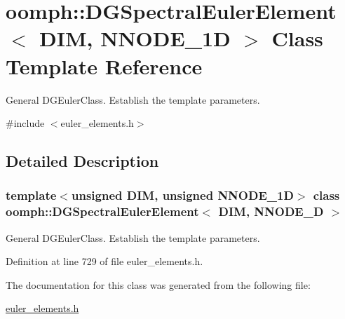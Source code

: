 \hypertarget{classoomph_1_1DGSpectralEulerElement}{}\section{oomph\+:\+:D\+G\+Spectral\+Euler\+Element$<$ D\+IM, N\+N\+O\+D\+E\+\_\+1D $>$ Class Template Reference}
\label{classoomph_1_1DGSpectralEulerElement}


General D\+G\+Euler\+Class. Establish the template parameters.  




{\ttfamily \#include $<$euler\+\_\+elements.\+h$>$}



\subsection{Detailed Description}
\subsubsection*{template$<$unsigned D\+IM, unsigned N\+N\+O\+D\+E\+\_\+1D$>$\newline
class oomph\+::\+D\+G\+Spectral\+Euler\+Element$<$ D\+I\+M, N\+N\+O\+D\+E\+\_\+D $>$}

General D\+G\+Euler\+Class. Establish the template parameters. 

Definition at line 729 of file euler\+\_\+elements.\+h.



The documentation for this class was generated from the following file\+:\begin{DoxyCompactItemize}
\item 
\hyperlink{euler__elements_8h}{euler\+\_\+elements.\+h}\end{DoxyCompactItemize}
